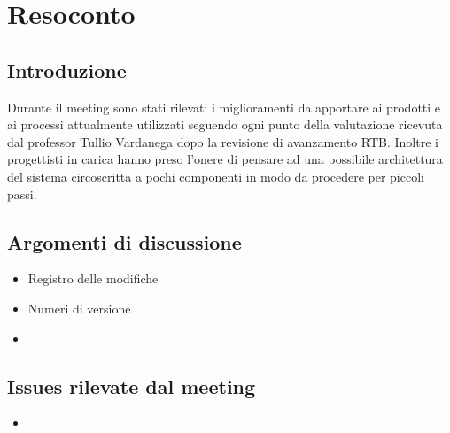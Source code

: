 \section{Resoconto}
\subsection{Introduzione}
Durante il meeting sono stati rilevati i miglioramenti da apportare ai prodotti e ai processi attualmente 
utilizzati seguendo ogni punto della valutazione ricevuta dal professor Tullio Vardanega dopo la revisione
di avanzamento RTB.
Inoltre i progettisti in carica hanno preso l'onere di pensare ad una possibile architettura del sistema 
circoscritta a pochi componenti in modo da procedere per piccoli passi.
\subsection{Argomenti di discussione}
\begin{itemize}
    \item Registro delle modifiche
    \item Numeri di versione
    \item 
\end{itemize}
\subsection*{Issues rilevate dal meeting}
\begin{itemize}
    \item 
\end{itemize}
